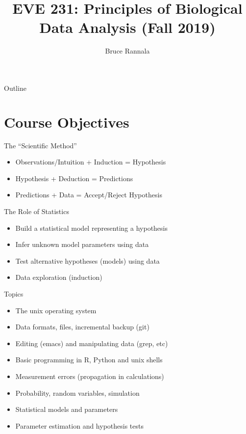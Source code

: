 \documentclass[xetex]{beamer}
\author{Bruce Rannala}
\date{}
\title{EVE 231: Principles of Biological Data Analysis (Fall 2019)}
\begin{document}
\maketitle
\begin{frame}{Outline}
\tableofcontents
\end{frame}


\section{Course Objectives}
\label{sec:org2c62fe2}
\begin{frame}[label={sec:org3282dfd}]{The ``Scientific Method''}
\begin{itemize}
\item Observations/Intuition + Induction = Hypothesis
\item Hypothesis + Deduction = Predictions
\item Predictions + Data = Accept/Reject Hypothesis
\end{itemize}
\end{frame}
\begin{frame}[label={sec:org2f54ed5}]{The Role of Statistics}
\begin{itemize}
\item Build a statistical model representing a hypothesis
\item Infer unknown model parameters using data
\item Test alternative hypotheses (models) using data
\item Data exploration (induction)
\end{itemize}
\end{frame}
\begin{frame}[label={sec:orgd45b5fb}]{Topics}
\begin{itemize}
\item The unix operating system
\item Data formats, files, incremental backup (git)
\item Editing (emacs) and manipulating data (grep, etc)
\item Basic programming in R, Python and unix shells
\item Measurement errors (propagation in calculations)
\item Probability, random variables, simulation
\item Statistical models and parameters
\item Parameter estimation and hypothesis tests
\end{itemize}
\end{frame}
\end{document}

